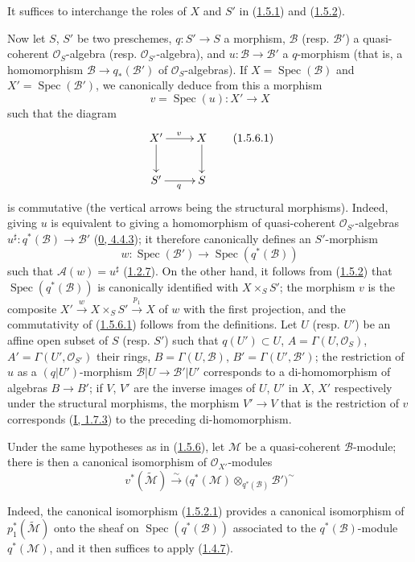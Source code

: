 It suffices to interchange the roles of $X$ and $S'$ in
(\hyperref[II.1.5.1]{1.5.1}) and
(\hyperref[II.1.5.2]{1.5.2}).

\begin{env}[1.5.6]
\label{II.1.5.6}
Now let $S$, $S'$ be two preschemes, $q:S'\to S$ a morphism,
$\mathcal{B}$ (resp. $\mathcal{B}'$) a quasi-coherent $\mathcal{O}_S$-algebra
(resp. $\mathcal{O}_{S'}$-algebra), and $u:\mathcal{B}\to\mathcal{B}'$
a $q$-morphism (that is, a homomorphism
$\mathcal{B}\to q_*(\mathcal{B}')$ of $\mathcal{O}_S$-algebras). If
$X=\operatorname{Spec}(\mathcal{B})$ and
$X'=\operatorname{Spec}(\mathcal{B}')$, we canonically deduce from this a
morphism
\[
  v=\operatorname{Spec}(u):X'\to X
\]
such that the diagram
\[
  \xymatrix{
    X'\ar[r]^v\ar[d] & X\ar[d]\\
    S'\ar[r]_q & S
  }
  \tag{1.5.6.1}\label{II.1.5.6.1}
\]
is commutative (the vertical arrows being the structural morphisms).
Indeed, giving $u$ is equivalent to giving a homomorphism of quasi-coherent
$\mathcal{O}_{S'}$-algebras
$u^\sharp:q^*(\mathcal{B})\to\mathcal{B}'$
(\hyperref[0.4.4.3]{0, 4.4.3}); it therefore canonically defines an
$S'$-morphism
\[
  w:\operatorname{Spec}(\mathcal{B}')\to
  \operatorname{Spec}(q^*(\mathcal{B}))
\]
such that $\mathcal{A}(w)=u^\sharp$
(\hyperref[II.1.2.7]{1.2.7}). On the other hand, it follows from
(\hyperref[II.1.5.2]{1.5.2}) that
$\operatorname{Spec}(q^*(\mathcal{B}))$ is canonically identified with
$X\times_S S'$; the morphism $v$ is the composite
$X'\xrightarrow{w}X\times_S S'\xrightarrow{p_1}X$ of $w$ with the first
projection, and the commutativity of
(\hyperref[II.1.5.6.1]{1.5.6.1}) follows from the definitions. Let $U$
(resp. $U'$) be an affine open subset of $S$ (resp. $S'$) such that
$q(U')\subset U$, $A=\Gamma(U,\mathcal{O}_S)$,
$A'=\Gamma(U',\mathcal{O}_{S'})$ their rings,
$B=\Gamma(U,\mathcal{B})$, $B'=\Gamma(U',\mathcal{B}')$; the restriction of
$u$ as a $(q|U')$-morphism
$\mathcal{B}|U\to\mathcal{B}'|U'$ corresponds to a di-homomorphism of
algebras $B\to B'$; if $V$, $V'$ are the inverse images of $U$, $U'$ in $X$,
$X'$ respectively under the structural morphisms, the morphism $V'\to V$
that is the restriction of $v$ corresponds (\hyperref[I.1.7.3]{I, 1.7.3})
to the preceding di-homomorphism.
\end{env}

\begin{env}[1.5.7]
\label{II.1.5.7}
Under the same hypotheses as in (\hyperref[II.1.5.6]{1.5.6}), let
$\mathcal{M}$ be a quasi-coherent $\mathcal{B}$-module; there is then a
canonical isomorphism of $\mathcal{O}_{X'}$-modules
\[
  v^*(\widetilde{\mathcal{M}})\xrightarrow{\sim}
  \bigl(q^*(\mathcal{M})\otimes_{q^*(\mathcal{B})}\mathcal{B}'\bigr)^{\sim}
  \tag{1.5.7.1}\label{II.1.5.7.1}
\]

Indeed, the canonical isomorphism
(\hyperref[II.1.5.2.1]{1.5.2.1}) provides a canonical isomorphism of
$p_1^*(\widetilde{\mathcal{M}})$ onto the sheaf on
$\operatorname{Spec}(q^*(\mathcal{B}))$ associated to the
$q^*(\mathcal{B})$-module $q^*(\mathcal{M})$, and it then suffices to apply
(\hyperref[II.1.4.7]{1.4.7}).
\end{env}

